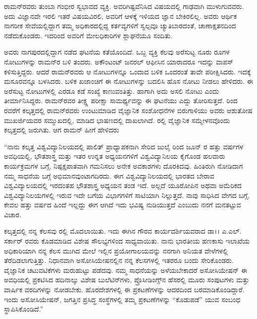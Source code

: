 
ರಾಮನ್‍ರವರು ತುಂಬಾ ಗಂಭೀರ ಸ್ವಭಾವದ ವ್ಯಕ್ತಿ. ಅವರಿಗಿಷ್ಟವೆನಿಸಿದ ವಿಷಯದಲ್ಲಿ ಗಾಢವಾಗಿ ಮುಳುಗುವವರು. ಅದು ವಿಜ್ಞಾನವೇ ಇರಲಿ ಇತರೆ ವಿಷಯವಿರಲಿ, ಅವರಿಗೆ ಆಳಕ್ಕೆ ಇಳಿಯದ ಜ್ಞಾನ ಬೇಕಿರಲಿಲ್ಲ. ಅವರು ಆರ್ಥಿಕ ನಾಗರೀಕ ಸೇವೆಯಲ್ಲಿದ್ದಾಗ ತಮ್ಮ ಅಧಿಕಾರದಲ್ಲಿದ್ದ ಕರ್ತವ್ಯಗಳಿಗೆ ಸ್ವಲ್ಪವೂ ಚ್ಯುತಿಬಾರದಂತೆ, ಚಾಣಾಕ್ಷತನದಿಂದ ನಡೆದುಕೊಂಡರು. ಇದರಿಂದ ಅವರಿಗೆ ಮೇಲಧಿಕಾರಿಗಳ ಶ್ಲಾಘನೆಯೂ ಸಂದಿತು.

ಅವರು ನಾಗಪುರದಲ್ಲಿದ್ದಾಗ ನಡೆದ ಘಟನೆಯ ಕತೆಯೊಂದಿದೆ. ಒಬ್ಬ ವ್ಯಕ್ತಿ ಕೆಲವು ಅರೆಸುಟ್ಟ ನೂರು ರೂಗಳ ನೋಟುಗಳನ್ನು ರಾಮನ್‍ರ ಬಳಿ ತಂದರು. ಅಕೌಂಟಂಟ್ ಜನರಲ್ ಆಫೀಸಿನ ಯಾರಾದರೂ ಇದನ್ನು ವಾಪಸ್ ಕಳಿಸುತ್ತಿದ್ದರು. ಆದರೆ ರಾಮನ್‍ರವರು ಆ ನೋಟುಗಳನ್ನೂ ಒಂದಾದ ಬಳಿಕ ಒಂದರಂತೆ ತಾವೇ ಪರೀಕ್ಷಿಸಿದರು. ಇದಕ್ಕೆ ಮಸೂರವನ್ನೂ ಬಳಸಿದರು. ಬಳಿಕ ಖಜಾಂಚಿಗೆ ಈ ನೋಟುಗಳನ್ನು ಬದಲಿಸಿ ಹೊಸ ನೋಟು ನೀಡಲು ಹೇಳಿದರು. ಈ ಅರೆಸುಟ್ಟ ನೋಟುಗಳಲ್ಲಿ ಎರಡೂ ಕಡೆ ಸಂಖ್ಯೆ ಕಾಣುವಂತಿತ್ತು. ಹಾಗಾಗಿ ಅದು ಅಸಲಿ ನೋಟು ಎಂದು ತೀರ್ಮಾನಿಸಿದ್ದರು. ರಾಮನ್‍ರವರ ತೀಕ್ಷ್ಣ ಪರೀಕ್ಷಾ ಸಾಮರ್ಥ್ಯವನ್ನು ಈ ಘಟನೆಯು ಎದ್ದು ತೋರಿಸುತ್ತದೆ.  ರಿಂದ  ರವರೆಗೆ ಕಲ್ಕತ್ತದಲ್ಲಿ ರಾಮನ್‍ರವರು ಉಂಟುಮಾಡಿದ ವೈಜ್ಞಾನಿಕ ಸಂಶೋಧನೆಗಳ ಬಿರುಗಾಳಿಯು ಅವರು ಆಶುತೋಷ ಮುಖರ್ಜಿಯವರ ಸಮ್ಮುಖದಲ್ಲಿ, ಮಾಡಿದ ಭಾಷಣದಲ್ಲಿ ದಾಖಲಾಗಿದೆ. ರಲ್ಲಿ ವೈಜ್ಞಾನಿಕ ಸಮ್ಮೇಳನವೊಂದು ಕಲ್ಕತ್ತದಲ್ಲಿ ಜರುಗಿತು. ಆಗ ರಾಮನ್ ಹೀಗೆ ಹೇಳಿದರು\enginline{--}

“ನಾನು ಕಲ್ಕತ್ತ ವಿಶ್ವವಿದ್ಯಾನಿಲಯದಲ್ಲಿ ಪಾಲಿತ್ ಪ್ರಾಧ್ಯಾಪಕನಾಗಿ ಸೇರಿದ ಜುಲೈ  ರಿಂದ ಜೂನ್ ರ ಹತ್ತು ವರ್ಷಗಳ ಅವಧಿಯಲ್ಲಿ, ಭೌತಶಾಸ್ತ್ರ ಮತ್ತು ಇತರ ಉನ್ನತ ಅಧ್ಯಯನಗಳಿಗೆ ವಿಶ್ವವಿದ್ಯಾನಿಲಯ ಕೈಗೊಂಡ ಹಲವಾರು ಕಾರ್ಯಕ್ರಮಗಳ ಬಗ್ಗೆ, ನಿಷ್ಪಕ್ಷಪಾತವಾಗಿ ಗಮನಿಸಲು ಅನೇಕ ಅವಕಾಶಗಳು ದೊರಕಿದವು. ಹಿಂತಿರುಗಿ ನೋಡಿದಾಗ ನಮ್ಮ ಸಾಧನೆಯ ಬಗ್ಗೆ ಅಭಿಮಾನವುಂಟಾಗದಿರದು. ಈಗ ವಿಶ್ವವಿದ್ಯಾನಿಲಯದಲ್ಲಿ ಭಾರತದ ಬೇರಾವ ವಿಶ್ವವಿದ್ಯಾಲಯದಲ್ಲಿ ಇರದಂತಹ ಭೌತಶಾಸ್ತ್ರ ಅಧ್ಯಯನ ತಂಡ ಇದೆ. ಅಲ್ಲದೆ ಯೂರೋಪಿನ ಅಥವಾ ಅಮೆರಿಕದ ವಿಶ್ವವಿದ್ಯಾನಿಲಯಗಳಲ್ಲಿ ಇರುವ ಇದೇ ಬಗೆಯ ವಿಭಾಗಗಳಿಗೆ ಸಾಟಿಯಾಗಿ ನಿಲ್ಲುತ್ತದೆ. ನಾವು ಸಾಧಿಸಿದ ವೇಗದ ಬಗ್ಗೆ, ಕೇವಲ ಹತ್ತು ವರ್ಷದ ಹಿಂದೆ ಇಲ್ಲದ್ದು ಈಗ ಆಗಿದೆ ಇದು ಭವಿಷ್ಯ ನುಡಿಯುತ್ತದೆ ಎಂಬುದು ನನಗೆ ಮನತಟ್ಟುವ ವಿಚಾರ.

ಕಲ್ಕತ್ತದಲ್ಲಿ ನನ್ನ ಕೆಲಸವು ರಲ್ಲಿ ಮೊದಲಾಯಿತು. ಇದು ಈಗಿನ ಗೌರವ ಕಾರ್ಯದರ್ಶಿ\-ಯವರಾದ ಡಾ।। ಎ.ಎಲ್. ಸರ್ಕಾರ್ ರವರು ಕೊಡಮಾಡಿದ ವಿಶೇಷ ಸೌಲಭ್ಯಗಳಿಂದ ಸಾಧ್ಯವಾಯಿತು. ನಾನು ಭಾರತೀಯ ಹಣಕಾಸು ಇಲಾಖೆಯ ಅಧಿಕಾರಿಯಾಗಿ ನನ್ನ ಕೆಲಸ ಮುಗಿದ ಮೇಲೆ ಇಲ್ಲಿನ ಪ್ರಯೋಗಾಲಯವನ್ನು ನನಗಾಗಿ ಅನಿಯತ ವೇಳೆಗಳಲ್ಲಿ ತೆರೆದಿಡಲಾಗುತ್ತಿತ್ತು. ನಿಧಾನವಾಗಿ ಅಸೋಸಿಯೇಷನಲ್ಲಿನ ನನ್ನ ಕೆಲಸಗಳಲ್ಲಿ ಇತರರೂ ಬಂದು ಸೇರಿಕೊಂಡರು. ವೈಜ್ಞಾನಿಕ ಚಟುವಟಿಕೆ\-ಗಳು ಮರುಹುಟ್ಟು ಪಡೆದವು. ನಮ್ಮ ಸಾಧನೆಯನ್ನು ಅಳೆಯಬೇಕಾದರೆ ಅಸೋಸಿಯೇಷನ್ ಈ ಅವಧಿಯಲ್ಲಿ ಪ್ರಕಟಿಸಿದ ಹದಿನಾಲ್ಕು ವಿಶೇಷ ಬುಲೆಟಿನ್‍ಗಳು, ಪ್ರೊಸೀಡಿಂಗ್ಸ್‌ನ ಹೆಸರಲ್ಲಿ ಮೂರು ಸಂಪುಟಗಳು ಮತ್ತು ವಾರ್ಷಿಕ ವರದಿಗಳನ್ನು ನೋಡಬೇಕು. ಹೊರದೇಶಗಳಲ್ಲಿ ಈ ಪ್ರಕಟಣೆಗಳನ್ನು ಆದರದಿಂದ ಬರಮಾಡಿಕೊಂಡಿದ್ದಾರೆ. ಇಂದು ಅಸೋಸಿಯೇಷನ್, ಜಗತ್ತಿನ ಪ್ರಸಿದ್ಧ ಸಂಸ್ಥೆಗಳಲ್ಲಿ ತಮ್ಮ ಪ್ರಕಟಣೆಗಳನ್ನು “ಕೊಡುಪಡೆ” ಯುವ ಸಂಬಂಧ ಸ್ಥಾಪಿಸಿಕೊಂಡಿದೆ.”

